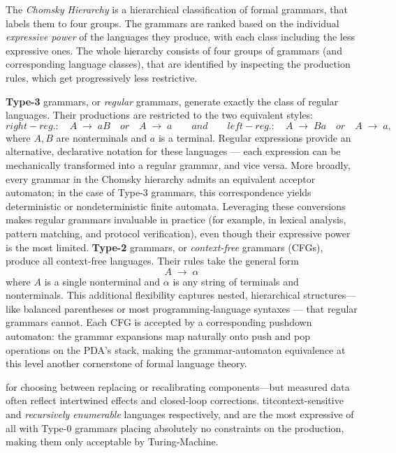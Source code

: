 \documentclass[11pt]{report}
\begin{document}
The \textit{Chomsky Hierarchy} is a hierarchical classification of formal grammars, that labels them to four groups. The grammars are ranked based on the
individual \textit{expressive power} of the languages they produce, with each class including the less expressive ones. The whole hierarchy consists of four
groups of grammars (and corresponding language classes), that are identified by inspecting the production rules, which get progressively less restrictive.

\textbf{Type-3} grammars, or \emph{regular} grammars, generate exactly the class of regular languages. Their productions are restricted to the two equivalent styles:  
\[
right-reg.: \quad A \;\to\; aB \quad or \quad A \;\to\; a
\qquad and \qquad
left-reg.: \quad A \;\to\; Ba \quad or \quad A \;\to\; a,
\]
where \(A,B\) are nonterminals and \(a\) is a terminal. Regular expressions provide an alternative, declarative notation for these languages — each expression
can be mechanically transformed into a regular grammar, and vice versa. More broadly, every grammar in the Chomsky hierarchy admits an equivalent acceptor automaton;
in the case of Type-3 grammars, this correspondence yields deterministic or nondeterministic finite automata. Leveraging these conversions makes regular grammars
invaluable in practice (for example, in lexical analysis, pattern matching, and protocol verification), even though their expressive power is the most limited.
\textbf{Type-2} grammars, or \emph{context-free} grammars (CFGs), produce all context-free languages.
Their rules take the general form  \[A \;\to\; \alpha\] where \(A\) is a single nonterminal and \(\alpha\) is any string of terminals and nonterminals.
This additional flexibility captures nested, hierarchical structures—like balanced parentheses or most programming‐language syntaxes — that regular grammars cannot.
Each CFG is accepted by a corresponding pushdown automaton: the grammar expansions map naturally onto push and pop operations on the PDA’s stack, making the grammar-automaton
equivalence at this level another cornerstone of formal language theory.

for choosing between replacing or recalibrating components—but measured data often reflect intertwined effects and closed-loop corrections. tit{context-sensitive} and \textit{recursively enumerable} languages respectively, and are the most expressive
of all with Type-0 grammars placing absolutely no constraints on the production, making them only acceptable by Turing-Machine.
\end{document}
